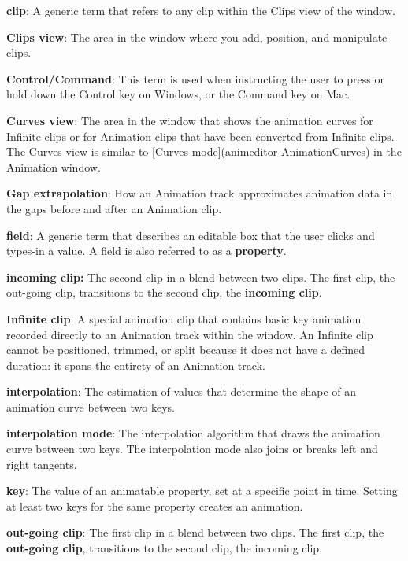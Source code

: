 {\bfseries{clip}}\+: A generic term that refers to any clip within the Clips view of the  window.

{\bfseries{Clips view}}\+: The area in the  window where you add, position, and manipulate clips.

{\bfseries{Control/\+Command}}\+: This term is used when instructing the user to press or hold down the Control key on Windows, or the Command key on Mac.

{\bfseries{Curves view}}\+: The area in the  window that shows the animation curves for Infinite clips or for Animation clips that have been converted from Infinite clips. The Curves view is similar to \mbox{[}Curves mode\mbox{]}(animeditor-\/\+Animation\+Curves) in the Animation window.

{\bfseries{Gap extrapolation}}\+: How an Animation track approximates animation data in the gaps before and after an Animation clip.

{\bfseries{field}}\+: A generic term that describes an editable box that the user clicks and types-\/in a value. A field is also referred to as a {\bfseries{property}}.

{\bfseries{incoming clip\+:}} The second clip in a blend between two clips. The first clip, the out-\/going clip, transitions to the second clip, the {\bfseries{incoming clip}}.

{\bfseries{Infinite clip}}\+: A special animation clip that contains basic key animation recorded directly to an Animation track within the  window. An Infinite clip cannot be positioned, trimmed, or split because it does not have a defined duration\+: it spans the entirety of an Animation track.

{\bfseries{interpolation}}\+: The estimation of values that determine the shape of an animation curve between two keys.

{\bfseries{interpolation mode}}\+: The interpolation algorithm that draws the animation curve between two keys. The interpolation mode also joins or breaks left and right tangents.

{\bfseries{key}}\+: The value of an animatable property, set at a specific point in time. Setting at least two keys for the same property creates an animation.

{\bfseries{out-\/going clip}}\+: The first clip in a blend between two clips. The first clip, the {\bfseries{out-\/going clip}}, transitions to the second clip, the incoming clip.

